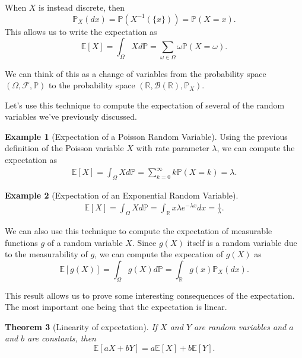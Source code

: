 \documentclass[12pt]{article}
\newcommand{\bbR}{\mathbb{R}}
\newcommand{\calF}{\mathcal{F}}
\newcommand{\Prob}{\mathbb{P}}
\newcommand{\Expect}{\mathbb{E}}
\newtheorem{thm}{Theorem}[section]
\theoremstyle{definition}
\newtheorem{exmp}[thm]{Example}
\theoremstyle{remark}
\numberwithin{equation}{section}
\begin{document}
When $X$ is instead discrete, then
\begin{equation}
  \Prob_X(dx) = \Prob(X^{-1}(\{x\})) = \Prob(X = x).
\end{equation}
This allows us to write the expectation as 
\begin{equation}
  \Expect[X] = \int_\Omega X d\Prob = \sum_{\omega\in\Omega} \omega \Prob(X = \omega).
\end{equation}

We can think of this as a change of variables from the probability space $(\Omega, \calF, \Prob)$ to the probability space $(\bbR, \mathcal{B}(\bbR), \Prob_X)$. 

Let's use this technique to compute the expectation of several of the random variables we've previously discussed. 

\begin{exmp}[Expectation of a Poisson Random Variable]
  Using the previous definition of the Poisson variable $X$ with rate parameter $\lambda$, we can compute the expectation as
  \begin{align}
    \Expect[X] = \int_\Omega X d\Prob = \sum_{k=0}^\infty k\Prob(X = k) = \lambda.
  \end{align}
\end{exmp}

\begin{exmp}[Expectation of an Exponential Random Variable]
\begin{align}
  \Expect[X] = \int_\Omega X d\Prob = \int_\bbR x \lambda e^{-\lambda x}dx = \frac{1}{\lambda}.
\end{align}
\end{exmp}

We can also use this technique to compute the expectation of measurable functions $g$ of a random variable $X$. Since $g(X)$ itself is a random variable due to the measurability of $g$, we can compute the expecation of $g(X)$ as
\begin{equation}
  \Expect[g(X)] = \int_\Omega g(X)d\Prob = \int_\bbR g(x) \Prob_X(dx).
\end{equation}

This result allows us to prove some interesting consequences of the expectation. The most important one being that the expectation is linear.

\begin{thm}[Linearity of expectation]
  If $X$ and $Y$ are random variables and $a$ and $b$ are constants, then 
  \begin{equation}
    \Expect[aX + bY] = a \Expect[X] + b \Expect[Y].
  \end{equation}
\end{thm}
\end{document}
